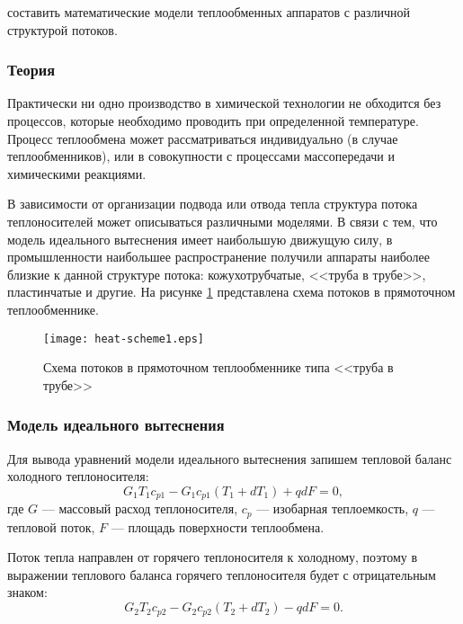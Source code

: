 
\goal составить математические модели теплообменных аппаратов с различной структурой потоков.

\subsubsection{Теория}
Практически ни одно производство в химической технологии не обходится без процессов, которые необходимо проводить при определенной температуре. Процесс теплообмена может рассматриваться индивидуально (в случае теплообменников), или в совокупности с процессами массопередачи и химическими реакциями.

В зависимости от организации подвода или отвода тепла структура потока теплоносителей может описываться различными моделями. В связи с тем, что модель идеального вытеснения имеет наибольшую движущую силу, в промышленности наибольшее распространение получили аппараты наиболее близкие к данной структуре потока: кожухотрубчатые, <<труба в трубе>>, пластинчатые и другие. На рисунке  \ref{fig:heat.scheme1} представлена схема потоков в прямоточном теплообменнике.

\begin{figure}[h]
	\begin{center}
		\texttt{[image: heat-scheme1.eps]}
	\end{center}
	\caption{Схема потоков в прямоточном теплообменнике типа <<труба в трубе>>} \label{fig:heat.scheme1}
\end{figure}

\subsubsection*{Модель идеального вытеснения}
Для вывода уравнений модели идеального вытеснения запишем тепловой баланс холодного теплоносителя:
\begin{equation}\label{eq:tbal-cold}
	G_1 T_1 c_{p1}-G_1 c_{p1} (T_1+ d T_1) + q d F=0,
\end{equation}
где $G$ --- массовый расход теплоносителя, $c_p$ --- изобарная теплоемкость, $q$ --- тепловой поток, $F$ --- площадь поверхности теплообмена.

Поток тепла направлен от горячего теплоносителя к холодному, поэтому в выражении  теплового баланса горячего теплоносителя будет с отрицательным знаком:
\begin{equation}\label{eq:tbal-hot}
	G_2 T_2 c_{p2} -G_2 c_{p2} (T_2 + d T_2) - q d F =0.
\end{equation}

